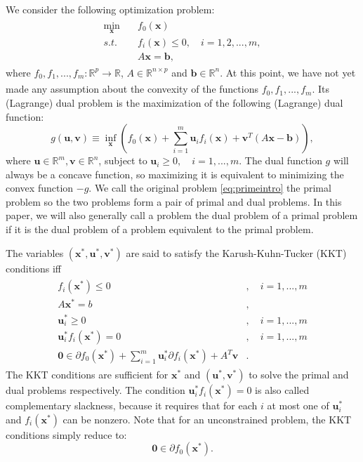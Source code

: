 We consider the following optimization problem:
\begin{gather}
    \begin{aligned}
        \label{eq:primeintro}
        \underset{\boldsymbol x}{\min}\quad &f_0(\boldsymbol x)\\
        \textit{s.t.}\quad &f_i(\boldsymbol x)\leq 0,\quad i=1,2,...,m,\\
        & A\boldsymbol x=\boldsymbol b,
    \end{aligned}
\end{gather}
where $f_0,f_1,...,f_m:\mathbb{R}^p\xrightarrow[]{}\mathbb{R}$, $A\in\mathbb{R}^{n\times p}$ and $\boldsymbol b\in\mathbb{R}^n$. At this point, we have not yet made any assumption about the convexity of the functions $f_0,f_1,...,f_m$. Its (Lagrange) dual problem is the maximization of the following (Lagrange) dual function:
\begin{equation}
    \label{eq:dualintro}
    g(\boldsymbol u,\boldsymbol v)\equiv \underset{\boldsymbol x}{\inf}\left(f_0(\boldsymbol x)+\sum_{i=1}^m\boldsymbol u_if_i(\boldsymbol x)+\boldsymbol v^T(A\boldsymbol x-\boldsymbol b)\right),
\end{equation}
where $\boldsymbol u\in\mathbb{R}^m,\boldsymbol v\in\mathbb{R}^n$, subject to $\boldsymbol u_i\geq 0,\quad i=1,...,m$. The dual function $g$ will always be a concave function, so maximizing it is equivalent to minimizing the convex function $-g$. We call the original problem \eqref{eq:primeintro} the primal problem so the two problems form a pair of primal and dual problems. In this paper, we will also generally call a problem the dual problem of a primal problem if it is the dual problem of a problem equivalent to the primal problem. 

The variables $(\boldsymbol x^*,\boldsymbol u^*,\boldsymbol v^*)$ are said to satisfy the Karush-Kuhn-Tucker (KKT) conditions iff
\begin{gather}
    \label{eq:kktintro}
    \begin{aligned}
        f_i(\boldsymbol x^*)\leq 0&,\quad i=1,...,m\\
        A\boldsymbol x^*=b&,\\
        \boldsymbol u^*_i\geq 0&,\quad i=1,...,m\\
        \boldsymbol u^*_i f_i(\boldsymbol x^*)=0&,\quad i=1,...,m\\
        \boldsymbol 0\in \partial f_0(\boldsymbol x^*)+\sum_{i=1}^m \boldsymbol u_i^*\partial f_i(\boldsymbol x^*)+A^T\boldsymbol v&.
    \end{aligned}
\end{gather}
The KKT conditions are sufficient for $\boldsymbol x^*$ and $(\boldsymbol u^*,\boldsymbol v^*)$ to solve the primal and dual problems respectively. The condition $\boldsymbol u_i^*f_i(\boldsymbol x^*)=0$ is also called complementary slackness, because it requires that for each $i$ at most one of $\boldsymbol u_i^*$ and $f_i(\boldsymbol x^*)$ can be nonzero. Note that for an unconstrained problem, the KKT conditions simply reduce to:
\begin{equation}
    \boldsymbol 0\in \partial f_0(\boldsymbol x^*).
\end{equation}

